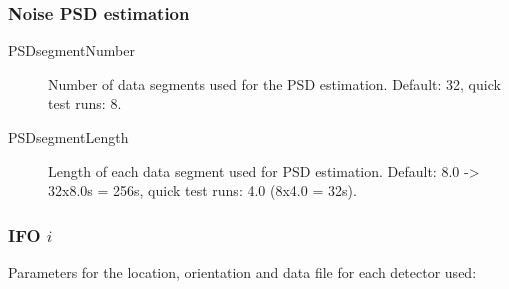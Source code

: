 \documentclass[10pt]{article}
\begin{document}
\subsubsection{Noise PSD estimation}
\begin{description}
\item[PSDsegmentNumber] Number of data segments used for the PSD estimation.  Default: 32, quick test runs: 8.
\item[PSDsegmentLength] Length of each data segment used for PSD estimation.  Default: 8.0 -> 32x8.0s = 256s, quick test runs: 4.0 (8x4.0 = 32s).
\end{description}




\subsubsection{IFO $i$}
Parameters for the location, orientation and data file for each detector used:
\end{document}
